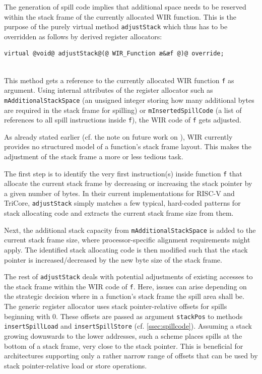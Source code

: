 The generation of spill code implies that additional space needs to be reserved within the stack frame of the currently allocated \gls{WIR} function.
This is the purpose of the purely virtual method \texttt{adjustStack} which thus has to be overridden as follows by derived register allocators: \\
\begin{lstlisting}[style=code,float=!ht,aboveskip=-0.8 \baselineskip,belowskip=-0.8 \baselineskip]
virtual @void@ adjustStack@(@ WIR_Function æ&æf @)@ override;
\end{lstlisting}
\\
This method gets a reference to the currently allocated \gls{WIR} function \texttt{f} as argument.
Using internal attributes of the register allocator such as \texttt{mAdditionalStackSpace} (an unsigned integer storing how many additional bytes are required in the stack frame for spilling) or \texttt{mInsertedSpillCode} (a list of references to all spill instructions inside \texttt{f}), the \gls{WIR} code of \texttt{f} gets adjusted.

As already stated earlier (cf. the note on future work on ), \gls{WIR} currently provides no structured model of a function's stack frame layout.
This makes the adjustment of the stack frame a more or less tedious task.

The first step is to identify the very first instruction(s) inside function \texttt{f} that allocate the current stack frame by decreasing or increasing the stack pointer by a given number of bytes.
In their current implementations for RISC-V and TriCore, \texttt{adjustStack} simply matches a few typical, hard-coded patterns for stack allocating code and extracts the current stack frame size from them.

Next, the additional stack capacity from \texttt{mAdditionalStackSpace} is added to the current stack frame size, where processor-specific alignment requirements might apply.
The identified stack allocating code is then modified such that the stack pointer is increased/decreased by the new byte size of the stack frame.

The rest of \texttt{adjustStack} deals with potential adjustments of existing accesses to the stack frame within the \gls{WIR} code of \texttt{f}.
Here, issues can arise depending on the strategic decision where in a function's stack frame the spill area shall be.
The generic register allocator uses stack pointer-relative offsets for spills beginning with 0.
These offsets are passed as argument \texttt{stackPos} to methods \texttt{insertSpillLoad} and \texttt{insertSpillStore} (cf. \cref{ssec:spillcode}).
Assuming a stack growing downwards to the lower addresses, such a scheme places spills at the bottom of a stack frame, very close to the stack pointer.
This is beneficial for architectures supporting only a rather narrow range of offsets that can be used by stack pointer-relative load or store operations.

